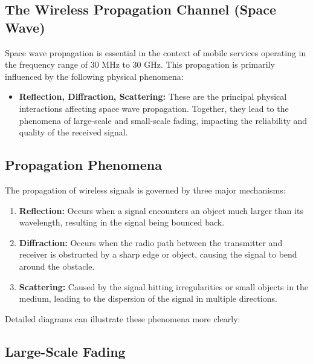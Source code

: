 \subsection*{The Wireless Propagation Channel (Space Wave)}

Space wave propagation is essential in the context of mobile services operating in the frequency range of 30 MHz to 30 GHz. This propagation is primarily influenced by the following physical phenomena:

\begin{itemize}
    \item \textbf{Reflection, Diffraction, Scattering:} These are the principal physical interactions affecting space wave propagation. Together, they lead to the phenomena of large-scale and small-scale fading, impacting the reliability and quality of the received signal.
\end{itemize}



\subsection*{Propagation Phenomena}

The propagation of wireless signals is governed by three major mechanisms:

\begin{enumerate}
    \item \textbf{Reflection:} Occurs when a signal encounters an object much larger than its wavelength, resulting in the signal being bounced back.
    \item \textbf{Diffraction:} Occurs when the radio path between the transmitter and receiver is obstructed by a sharp edge or object, causing the signal to bend around the obstacle.
    \item \textbf{Scattering:} Caused by the signal hitting irregularities or small objects in the medium, leading to the dispersion of the signal in multiple directions.
\end{enumerate}

Detailed diagrams can illustrate these phenomena more clearly:




\subsection*{Large-Scale Fading}

